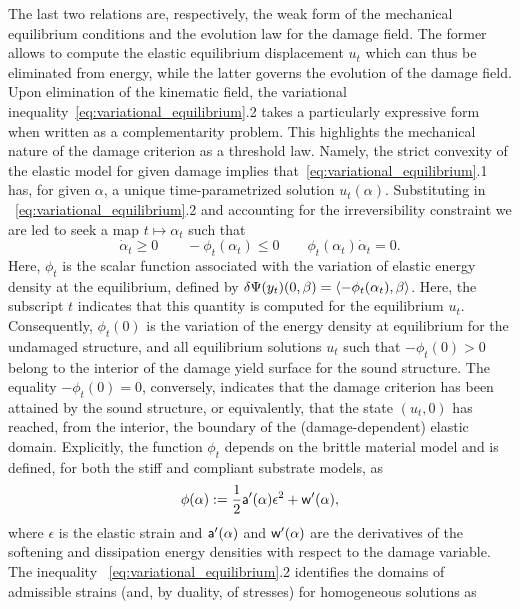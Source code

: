 \documentclass[10pt]{article}
\begin{document}
%
The last two relations are, respectively, the weak form of the mechanical equilibrium conditions and the  evolution law  for the damage field.
The former allows to compute the elastic equilibrium displacement $u_t$ which can thus be eliminated from energy, while the latter governs the evolution of the damage field.
Upon elimination of the kinematic field, the variational inequality~\eqref{eq:variational_equilibrium}.2 takes a particularly expressive form when written as a complementarity problem. This highlights the mechanical nature of the damage criterion as a threshold law.
Namely, the strict convexity of the elastic model for given damage implies that~\eqref{eq:variational_equilibrium}.1 has, for given $\alpha$, a unique time-parametrized solution $u_t(\alpha)$. 
Substituting in ~\eqref{eq:variational_equilibrium}.2 and accounting for the irreversibility constraint we are led to seek a map $t\mapsto\alpha_t$ such that 
%
    \begin{equation}
    \label{eq:complementarity}
    \dot \alpha_t \geq 0 \qquad 
     -\phi_t(\alpha_t) \leq 0 \qquad
     \phi_t(\alpha_t)\dot \alpha_t = 0.
\end{equation}
Here, $\phi_t$ is the scalar function associated with  the variation of elastic energy density at the equilibrium, defined by $\delta \Psi(y_t)(0, \beta) = \langle -\phi_t(\alpha_t), \beta\rangle$. Here, the subscript $t$ indicates that this quantity is computed for the equilibrium $u_t$.
%
Consequently, $\phi_t(0)$ is 
%
the variation of the  energy density at equilibrium for the undamaged structure, and all equilibrium solutions $u_t$ such that $-\phi_t(0) > 0$ belong to the interior of the damage yield surface for the sound structure. The equality $-\phi_t(0) = 0$, conversely, indicates that the damage criterion has been attained by the sound structure, or equivalently, that the state $(u_t, 0)$ has reached, from the interior, the boundary of the (damage-dependent) elastic domain. 
%
%
%
Explicitly, the function $\phi_t$ depends on the brittle material model and is defined, for both the stiff and compliant substrate models, as
\begin{equation}
    \label{eq:energy_release_rate}
    \phi(\alpha) := \frac{1}{2}\mathsf{a}'(\alpha)\epsilon^2 + \mathsf{w}'(\alpha),
\end{equation}
where $\epsilon$ is the elastic strain and $\mathsf{a}'(\alpha)$ and $\mathsf{w}'(\alpha)$ are the derivatives of the softening and dissipation energy densities with respect to the damage variable.
The inequality ~\eqref{eq:variational_equilibrium}.2 identifies the domains of admissible strains (and, by duality, of stresses) for homogeneous solutions as
\end{document}
